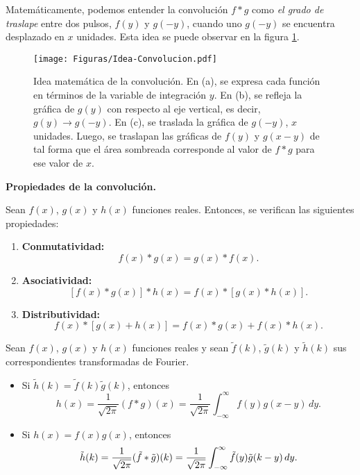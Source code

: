 Matemáticamente, podemos entender la convolución $f * g$ como \emph{el grado de traslape} entre dos pulsos, $f(y)$ y $g(-y)$, cuando uno $g(-y)$ se encuentra desplazado en $x$ unidades. Esta idea se puede observar en la figura \ref{fig:IdeaConvolucion}.

\begin{figure}[htbp]
    \centering
    \texttt{[image: Figuras/Idea-Convolucion.pdf]}
    \caption{Idea matemática de la convolución. En (a), se expresa cada función en términos de la variable de integración $y$. En (b), se refleja la gráfica de $g(y)$ con respecto al eje vertical, es decir, $g(y) \rightarrow g(-y)$. En (c), se traslada la gráfica de $g(-y)$, $x$ unidades. Luego, se traslapan las gráficas de $f(y)$ y $g(x-y)$ de tal forma que el área sombreada corresponde al valor de $f * g$ para ese valor de $x$.}
    \label{fig:IdeaConvolucion}
\end{figure}


\begin{propiedad}\textbf{Propiedades de la convolución.}

Sean $f(x)$, $g(x)$ y $h(x)$  funciones reales. Entonces, se verifican las siguientes propiedades:

\begin{enumerate}
    \item \textbf{Conmutatividad:}$$f(x) * g(x) = g(x) * f(x).$$
    
    \item \textbf{Asociatividad:} $$[f(x)*g(x)]*h(x) = f(x)*[g(x)*h(x)].$$
    
    \item \textbf{Distributividad:} $$f(x)*[g(x)+h(x)] = f(x)*g(x) + f(x)*h(x).$$ 
\end{enumerate}
\end{propiedad}

\newpage

\begin{teorema}
Sean $f(x)$, $g(x)$ y $h(x)$  funciones reales y sean $\tilde{f}(k)$, $\tilde{g}(k)$ y $\tilde{h}(k)$ sus correspondientes transformadas de Fourier. 

\begin{itemize}
    \item Si $\tilde{h}(k) = \tilde{f}(k) \tilde{g}(k)$, entonces 
$$ h(x) = \frac{1}{\sqrt{2\pi}} (f * g)(x) = \frac{1}{\sqrt{2\pi}} \int_{-\infty}^{\infty} f(y) g(x-y) \,dy.$$ 

    \item Si $h(x) = f(x) g(x)$, entonces
    \begin{equation}
        \Tilde{h}(k) = \frac{1}{\sqrt{2\pi}}(\Tilde{f} * \Tilde{g})(k) = \frac{1}{\sqrt{2\pi}} \int_{-\infty}^{\infty} \Tilde{f}(y) \Tilde{g}(k-y) \,dy.
    \end{equation}
\end{itemize}
\end{teorema}

